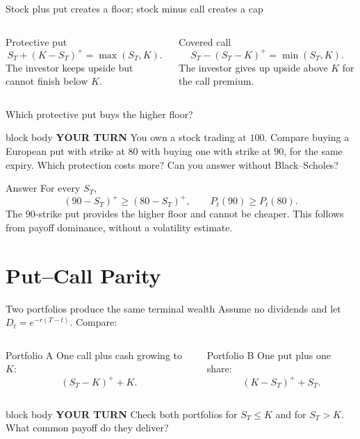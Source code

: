 \documentclass[handout,10pt,aspectratio=169]{beamer}
\newenvironment{pausebox}{\begin{beamercolorbox}[rounded=true,sep=0.8em,wd=\textwidth]{block body}
  \textbf{\color{CourseGold}YOUR TURN}\quad}{\end{beamercolorbox}}
\newcommand{\1}{\mathbf 1}
\begin{document}
\begin{frame}{Stock plus put creates a floor; stock minus call creates a cap}
\begin{columns}[T,onlytextwidth]
\begin{block}{Protective put}
\[
S_T+(K-S_T)^+=\max(S_T,K).
\]
The investor keeps upside but cannot finish below \(K\).
\end{block}
\begin{exampleblock}{Covered call}
\[
S_T-(S_T-K)^+=\min(S_T,K).
\]
The investor gives up upside above \(K\) for the call premium.
\end{exampleblock}
\end{columns}
\end{frame}

\begin{frame}{Which protective put buys the higher floor?}
\begin{pausebox}
You own a stock trading at \(100\). Compare buying a European put with strike
at \(80\) with buying one with strike at \(90\), for the same expiry.
Which protection costs more? Can you answer without Black--Scholes?
\end{pausebox}

\begin{exampleblock}{Answer}
For every \(S_T\),
\[
(90-S_T)^+\ge(80-S_T)^+,
\qquad\boxed{P_t(90)\ge P_t(80).}
\]
The \(90\)-strike put provides the higher floor and cannot be cheaper.
This follows from payoff dominance, without a volatility estimate.
\end{exampleblock}
\end{frame}

\section{Put--Call Parity}

\begin{frame}{Two portfolios produce the same terminal wealth}
Assume no dividends and let \(D_t=e^{-r(T-t)}\). Compare:
\begin{columns}[T,onlytextwidth]
\begin{block}{Portfolio A}
One call plus cash growing to \(K\):
\[
(S_T-K)^+ + K.
\]
\end{block}
\begin{exampleblock}{Portfolio B}
One put plus one share:
\[
(K-S_T)^+ + S_T.
\]
\end{exampleblock}
\end{columns}
\begin{pausebox}
Check both portfolios for \(S_T\le K\) and for \(S_T>K\). What common
payoff do they deliver?
\end{pausebox}
\end{frame}
\end{document}
